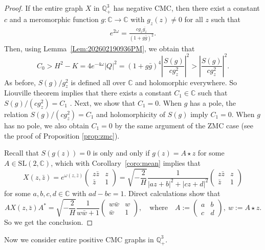 \documentclass[12pt,reqno]{amsart}
\theoremstyle{plain} %
\theoremstyle{definition}
\numberwithin{equation}{section}
\newcommand{\sltc}{\mathrm{SL}(2,\mathbb{C})}
\newcommand{\qthreep}{\mathbb{Q}^3_+}
\newcommand{\h}{H}%
\begin{document}
\begin{proof}
	If the entire graph $X$ in $\qthreep$ has negative CMC, then there exist a constant $c$ and a meromorphic function
	$g:\mathbb{C}\to\hat{\mathbb{C}}$ with $g_z(z) \ne 0$ for all $z$ such that
	\begin{align}\label{Eq:202511151536}
		e^{2\omega} = \frac{c g_z \overline{g_z}}{(1+ g\bar{g})^2}.
	\end{align}
	Then, using Lemma~\ref{Lem:202602190936PM}, we obtain that
	$$
		C_0 > H^2-K = 4 e^{-4\omega} |Q|^2 = (1+ g\bar{g})^4 \left| \frac{S(g)}{cg_z^2} \right|^2 > \left| \frac{S(g)}{cg_z^2} \right|^2.
	$$
	As before, $S(g)/g_z^2$ is defined all over $\mathbb{C}$ and holomorphic everywhere. So Liouville theorem implies that there exists a constant $C_1\in\mathbb{C}$ such that ${S(g)}/{(cg_z^2)}=C_1$ .
	Next, we show that $C_1=0$. When $g$ has a pole, the relation ${S(g)}/{(cg_z^2)}=C_1$ and holomorphicity of $S(g)$  imply $C_1=0$. When $g$ has no pole, we also obtain $C_1=0$ by the same argument of the ZMC case (see the proof of Proposition \ref{prop:zmc}).

	Recall that $S(g(z))=0$ is only and only if $g(z)= A \star z$ for some $A \in \sltc$,
	which with Corollary~\ref{coro:mean} implies that
	\[
		X(z,\bar{z}) = e^{\omega(z,\bar{z})} \begin{pmatrix} z\bar{z} & z \\ \bar{z} & 1 \end{pmatrix} = \sqrt{-\frac{2}{\h}}\frac{1 }{|az+b|^2+|cz+d|^2}\begin{pmatrix} z\bar{z} & z \\ \bar{z} & 1 \end{pmatrix}
	\]
	for some $a,b,c,d \in \mathbb{C}$ with $ad-bc=1$.
	Direct calculations show that
	$$
		A X (z, \bar{z}) A^* = \sqrt{-\frac{2}{\h}}\frac{1}{ w\bar{w} +1} \begin{pmatrix} w \bar{w} & w \\ \bar{w} & 1 \end{pmatrix}, \quad \text{where}\quad A := \begin{pmatrix} a & b \\ c & d \end{pmatrix}, \ w := A \star z.
	$$
	So we get the conclusion.
\end{proof}

Now we consider  entire positive CMC graphs in $\qthreep$.
\end{document}
